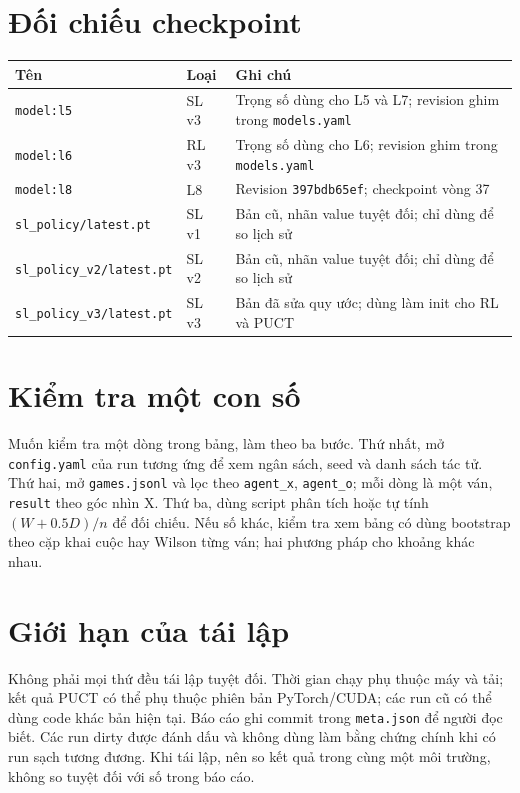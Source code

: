 \section{Đối chiếu checkpoint}
\begin{center}\small
\begin{tabularx}{\textwidth}{@{}l l X@{}}
\toprule
\textbf{Tên} & \textbf{Loại} & \textbf{Ghi chú} \\
\midrule
\texttt{model:l5} & SL v3 & Trọng số dùng cho L5 và L7; revision ghim trong \texttt{models.yaml} \\
\texttt{model:l6} & RL v3 & Trọng số dùng cho L6; revision ghim trong \texttt{models.yaml} \\
\texttt{model:l8} & L8 & Revision \texttt{397bdb65ef}; checkpoint vòng 37 \\
\texttt{sl\_policy/latest.pt} & SL v1 & Bản cũ, nhãn value tuyệt đối; chỉ dùng để so lịch sử \\
\texttt{sl\_policy\_v2/latest.pt} & SL v2 & Bản cũ, nhãn value tuyệt đối; chỉ dùng để so lịch sử \\
\texttt{sl\_policy\_v3/latest.pt} & SL v3 & Bản đã sửa quy ước; dùng làm init cho RL và PUCT \\
\bottomrule
\end{tabularx}
\end{center}

\section{Kiểm tra một con số}
Muốn kiểm tra một dòng trong bảng, làm theo ba bước. Thứ nhất, mở \texttt{config.yaml} của run
tương ứng để xem ngân sách, seed và danh sách tác tử. Thứ hai, mở \texttt{games.jsonl} và lọc
theo \texttt{agent\_x}, \texttt{agent\_o}; mỗi dòng là một ván, \texttt{result} theo góc nhìn
X. Thứ ba, dùng script phân tích hoặc tự tính $(W+0.5D)/n$ để đối chiếu. Nếu số khác, kiểm tra
xem bảng có dùng bootstrap theo cặp khai cuộc hay Wilson từng ván; hai phương pháp cho khoảng
khác nhau.

\section{Giới hạn của tái lập}
Không phải mọi thứ đều tái lập tuyệt đối. Thời gian chạy phụ thuộc máy và tải; kết quả PUCT có
thể phụ thuộc phiên bản PyTorch/CUDA; các run cũ có thể dùng code khác bản hiện tại. Báo cáo
ghi commit trong \texttt{meta.json} để người đọc biết. Các run dirty được đánh dấu và không
dùng làm bằng chứng chính khi có run sạch tương đương. Khi tái lập, nên so kết quả trong cùng
một môi trường, không so tuyệt đối với số trong báo cáo.